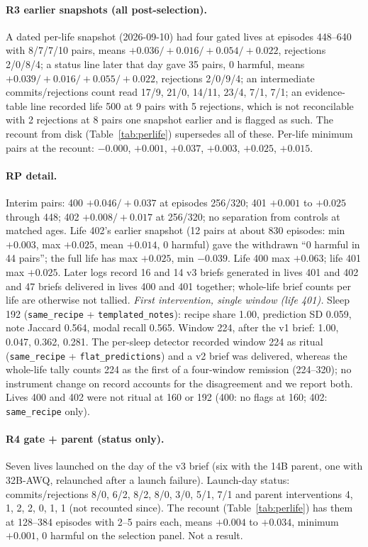 \documentclass{article}
\begin{document}
\paragraph{R3 earlier snapshots (all post-selection).} A dated per-life snapshot (2026-09-10) had four gated lives at episodes 448--640 with 8/7/7/10 pairs, means $+0.036/+0.016/+0.054/+0.022$, rejections 2/0/8/4; a status line later that day gave 35 pairs, 0 harmful, means $+0.039/+0.016/+0.055/+0.022$, rejections 2/0/9/4; an intermediate commits/rejections count read 17/9, 21/0, 14/11, 23/4, 7/1, 7/1; an evidence-table line recorded life 500 at 9 pairs with 5 rejections, which is not reconcilable with 2 rejections at 8 pairs one snapshot earlier and is flagged as such. The recount from disk (Table~\ref{tab:perlife}) supersedes all of these. Per-life minimum pairs at the recount: $-0.000$, $+0.001$, $+0.037$, $+0.003$, $+0.025$, $+0.015$.

\paragraph{RP detail.} Interim pairs: 400 $+0.046/+0.037$ at episodes 256/320; 401 $+0.001$ to $+0.025$ through 448; 402 $+0.008/+0.017$ at 256/320; no separation from controls at matched ages. Life 402's earlier snapshot (12 pairs at about 830 episodes: min $+0.003$, max $+0.025$, mean $+0.014$, 0 harmful) gave the withdrawn ``0 harmful in 44 pairs''; the full life has max $+0.025$, min $-0.039$. Life 400 max $+0.063$; life 401 max $+0.025$. Later logs record 16 and 14 v3 briefs generated in lives 401 and 402 and 47 briefs delivered in lives 400 and 401 together; whole-life brief counts per life are otherwise not tallied. \emph{First intervention, single window (life 401).} Sleep 192 (\texttt{same\_recipe} + \texttt{templated\_notes}): recipe share 1.00, prediction SD 0.059, note Jaccard 0.564, modal recall 0.565. Window 224, after the v1 brief: 1.00, 0.047, 0.362, 0.281. The per-sleep detector recorded window 224 as ritual (\texttt{same\_recipe} + \texttt{flat\_predictions}) and a v2 brief was delivered, whereas the whole-life tally counts 224 as the first of a four-window remission (224--320); no instrument change on record accounts for the disagreement and we report both. Lives 400 and 402 were not ritual at 160 or 192 (400: no flags at 160; 402: \texttt{same\_recipe} only).

\paragraph{R4 gate + parent (status only).} Seven lives launched on the day of the v3 brief (six with the 14B parent, one with 32B-AWQ, relaunched after a launch failure). Launch-day status: commits/rejections 8/0, 6/2, 8/2, 8/0, 3/0, 5/1, 7/1 and parent interventions 4, 1, 2, 2, 0, 1, 1 (not recounted since). The recount (Table~\ref{tab:perlife}) has them at 128--384 episodes with 2--5 pairs each, means $+0.004$ to $+0.034$, minimum $+0.001$, 0 harmful on the selection panel. Not a result.
\end{document}
